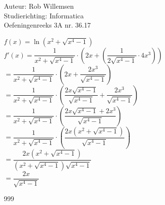 \documentclass[a4paper]{article}
\begin{document}
\noindent \large Auteur: Rob Willemsen \\
\noindent \large Studierichting: Informatica \\
\noindent \large Oefeningenreeks 3A nr. 36.17 \\

\medskip

\normalsize

$f(x) = \ln(x^2 + \sqrt{x^4 -1})$ \\

$f'(x) = \dfrac{1}{x^2 + \sqrt{x^4 -1}} \cdot \left(2x + \left(\dfrac{1}{2\sqrt{x^4-1}} \cdot 4x^3\right)\right)$ \\

$= \dfrac{1}{x^2 + \sqrt{x^4 -1}} \cdot \left(2x + \dfrac{2x^3}{\sqrt{x^4-1}}\right)$ \\

$= \dfrac{1}{x^2 + \sqrt{x^4 -1}} \cdot \left(\dfrac{2x\sqrt{x^4-1}}{\sqrt{x^4-1}} + \dfrac{2x^3}{\sqrt{x^4-1}}\right)$ \\

$= \dfrac{1}{x^2 + \sqrt{x^4 -1}} \cdot \left(\dfrac{2x\sqrt{x^4-1} + 2x^3}{\sqrt{x^4-1}}\right)$ \\

$= \dfrac{1}{x^2 + \sqrt{x^4 -1}} \cdot \left(\dfrac{2x(x^2 + \sqrt{x^4-1})}{\sqrt{x^4-1}}\right)$ \\

$= \dfrac{2x(x^2 + \sqrt{x^4-1})}{(x^2 + \sqrt{x^4 -1})\sqrt{x^4-1}}$ \\

$= \dfrac{2x}{\sqrt{x^4-1}}$ \\

\begin{thebibliography}{999}
\end{thebibliography}
\end{document}
